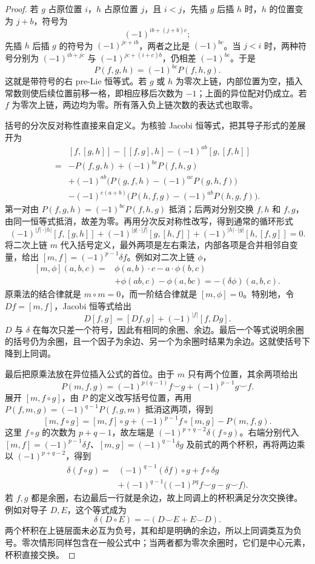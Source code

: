 \begin{proof}
	若 \(g\) 占原位置 \(i\)，\(h\) 占原位置 \(j\)，且 \(i<j\)，先插 \(g\) 后插 \(h\) 时，\(h\) 的位置变为 \(j+b\)，符号为
	\[
		(-1)^{ib+(j+b)c};
	\]
	先插 \(h\) 后插 \(g\) 的符号为 \((-1)^{jc+ib}\)，两者之比是 \((-1)^{bc}\)。当 \(j<i\) 时，两种符号分别为 \((-1)^{ib+jc}\) 与 \((-1)^{jc+(i+c)b}\)，仍相差 \((-1)^{bc}\)。于是
	\[
		P(f,g,h)=(-1)^{bc}P(f,h,g).
	\]
	这就是带符号的右 pre-Lie 恒等式。若 \(g\) 或 \(h\) 为零次上链，内部位置为空，插入常数则使后续位置前移一格，即相应移后次数为 \(-1\)；上面的异位配对仍成立。若 \(f\) 为零次上链，两边均为零。所有落入负上链次数的表达式也取零。

	括号的分次反对称性直接来自定义。为核验 Jacobi 恒等式，把其导子形式的差展开为
	\[
		\begin{aligned}
			&[f,[g,h]]-[[f,g],h]-(-1)^{ab}[g,[f,h]]\\
			={}&-P(f,g,h)+(-1)^{bc}P(f,h,g)\\
			&+(-1)^{ab}\bigl(P(g,f,h)-(-1)^{ac}P(g,h,f)\bigr)\\
			&-(-1)^{c(a+b)}\bigl(P(h,f,g)-(-1)^{ab}P(h,g,f)\bigr).
		\end{aligned}
	\]
	第一对由 \(P(f,g,h)=(-1)^{bc}P(f,h,g)\) 抵消；后两对分别交换 \(f,h\) 和 \(f,g\)，由同一恒等式抵消，故差为零。再用分次反对称性改写，得到通常的循环形式
	\[
		(-1)^{|f|\cdot|h|}[f,[g,h]] +(-1)^{|g|\cdot|f|}[g,[h,f]] +(-1)^{|h|\cdot|g|}[h,[f,g]]=0.
	\]
	将二次上链 \(m\) 代入括号定义，最外两项是左右乘法，内部各项是合并相邻自变量，给出 \([m,f]=(-1)^{p-1}\delta f\)。例如对二次上链 \(\phi\)，
	\[
		\begin{aligned}
			[m,\phi](a,b,c) ={}&\phi(a,b)\cdot c-a\cdot\phi(b,c)\\
			&+\phi(ab,c)-\phi(a,bc) =-(\delta\phi)(a,b,c).
		\end{aligned}
	\]
	原乘法的结合律就是 \(m\circ m=0\)，而一阶结合律就是 \([m,\phi]=0\)。特别地，令 \(D f=[m,f]\)，Jacobi 恒等式给出
	\[
		D[f,g]=[Df,g]+(-1)^{|f|}[f,Dg].
	\]
	\(D\) 与 \(\delta\) 在每次只差一个符号，因此有相同的余圈、余边。最后一个等式说明余圈的括号仍为余圈，且一个因子为余边、另一个为余圈时结果为余边。这就使括号下降到上同调。

	最后把原乘法放在异位插入公式的首位。由于 \(m\) 只有两个位置，其余两项给出
	\[
		P(m,f,g)=(-1)^{p(q-1)}f\smile g+(-1)^{p-1}g\smile f.
	\]
	展开 \([m,f\circ g]\)，由 \(P\) 的定义改写括号位置，再用 \(P(f,m,g)=(-1)^{q-1}P(f,g,m)\) 抵消这两项，得到
	\[
		[m,f\circ g]=[m,f]\circ g+(-1)^{p-1}f\circ[m,g]-P(m,f,g).
	\]
	这里 \(f\circ g\) 的次数为 \(p+q-1\)，故左端是 \((-1)^{p+q-2}\delta(f\circ g)\)。右端分别代入 \([m,f]=(-1)^{p-1}\delta f\)、\([m,g]=(-1)^{q-1}\delta g\) 及前式的两个杯积，再将两边乘以 \((-1)^{p+q-2}\)，得到
	\[
		\begin{aligned}
			\delta(f\circ g) ={}&(-1)^{q-1}(\delta f)\circ g+f\circ\delta g\\
			&+(-1)^{q-1}\bigl((-1)^{pq}f\smile g-g\smile f\bigr).
		\end{aligned}
	\]
	若 \(f,g\) 都是余圈，右边最后一行就是余边，故上同调上的杯积满足分次交换律。例如对导子 \(D,E\)，这个等式成为
	\[
		\delta(D\circ E)=-(D\smile E+E\smile D).
	\]
	两个杯积在上链层面未必互为负号，其和却是明确的余边，所以上同调类互为负号。零次情形同样包含在一般公式中；当两者都为零次余圈时，它们是中心元素，杯积直接交换。
\end{proof}

